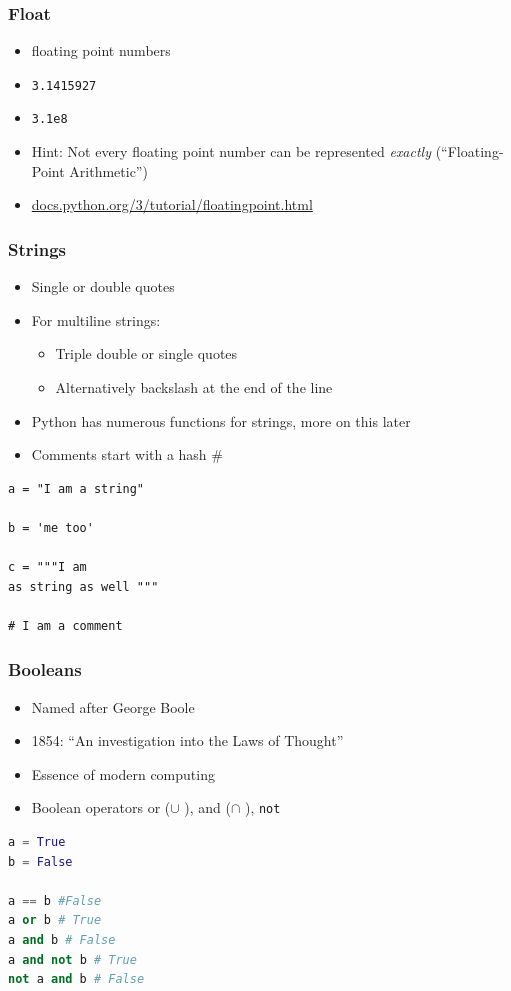 \documentclass[ngerman]{beamer}
\begin{document}
\begin{frame}
\frametitle{Float}

\begin{itemize}
	\item floating point numbers
	\item \texttt{3.1415927}
	\item \texttt{3.1e8}
	\item Hint: Not every floating point number can be represented \textit{exactly} (\enquote{Floating-Point Arithmetic}) 
	\item \url{docs.python.org/3/tutorial/floatingpoint.html}
\end{itemize}
\end{frame}

\begin{frame}[containsverbatim]
\frametitle{Strings}

\begin{itemize}
\item Single or double quotes
\item For multiline strings:

\begin{itemize}
	\item Triple double or single quotes
	\item Alternatively backslash at the end of the line 
\end{itemize}

\item Python has numerous functions for strings, more on this later
\item Comments start with a hash \#
\end{itemize}


\begin{lstlisting}[style=Python]
a = "I am a string"

b = 'me too'

c = """I am 
as string as well """

# I am a comment
\end{lstlisting}


\end{frame}

\begin{frame}[containsverbatim]
\frametitle{Booleans}

\begin{itemize}
	\item Named after George Boole
	\item 1854: \enquote{An investigation into the Laws of Thought}
	\item Essence of modern computing
	\item Boolean operators or ($\cup$ ),  and ($\cap$ ), \texttt{not}
\end{itemize}

\begin{lstlisting}[language={Python}]
a = True
b = False 

a == b #False
a or b # True
a and b # False
a and not b # True
not a and b # False
\end{lstlisting}
\end{frame}
\end{document}
